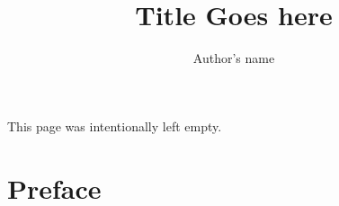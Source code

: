 \documentclass{book}
\title{Title Goes here}
\author{Author's name}
\date{}
\begin{document}
\maketitle
\thispagestyle{empty}
This page was intentionally left empty.


\begingroup
\color{teal}
\tableofcontents
\frontmatter
\chapter{Preface}
\mainmatter

\chapter{}
\section{}
\blindtext
\chapter{}
\section{}
\blindtext
\chapter{}
\section{}
\blindtext
\chapter{}
\section{}
\blindtext
\endgroup
\begin{chapter}

\end{chapter}


\begin{tcolorbox}
\noindent{}
\end{tcolorbox}
\end{document}
